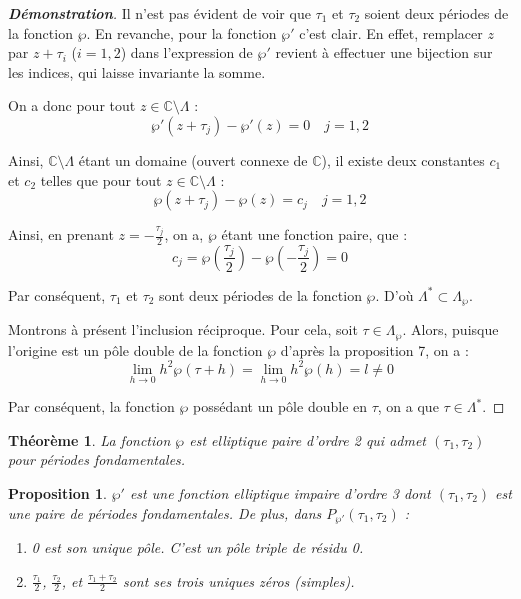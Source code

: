 \documentclass[12pt]{article}
\newtheorem{theorem}{Théorème}
\newtheorem{proposition}{Proposition}
\begin{document}
            \begin{proof}[\textbf{Démonstration}] 
            Il n'est pas évident de voir que \(\tau_1\) et \(\tau_2\) soient deux périodes de la fonction \(\wp\). En revanche, pour la fonction \(\wp'\) c'est clair. En effet, remplacer \(z\) par \(z + \tau_i\) (\(i = 1, 2\)) dans l'expression de \(\wp'\) revient à effectuer une bijection sur les indices, qui laisse invariante la somme.
            
            On a donc pour tout \(z \in \mathbb{C} \setminus \Lambda\) :
            \[
            \wp'(z + \tau_j) - \wp'(z) = 0 \quad j = 1, 2
            \]
            
            Ainsi, \(\mathbb{C} \setminus \Lambda\) étant un domaine (ouvert connexe de \(\mathbb{C}\)), il existe deux constantes \(c_1\) et \(c_2\) telles que pour tout \(z \in \mathbb{C} \setminus \Lambda\) :
            \[
            \wp(z + \tau_j) - \wp(z) = c_j \quad j = 1, 2
            \]
            
            Ainsi, en prenant \(z = -\frac{\tau_j}{2}\), on a, \(\wp\) étant une fonction paire, que :
            \[
            c_j = \wp\left(\frac{\tau_j}{2}\right) - \wp\left(-\frac{\tau_j}{2}\right) = 0
            \]
            
            Par conséquent, \(\tau_1\) et \(\tau_2\) sont deux périodes de la fonction \(\wp\). D'où \(\Lambda^* \subset \Lambda_{\wp}\).
            
            Montrons à présent l'inclusion réciproque. Pour cela, soit \(\tau \in \Lambda_{\wp}\). Alors, puisque l'origine est un pôle double de la fonction \(\wp\) d'après la proposition 7, on a :
            \[
            \lim_{h \to 0} h^2 \wp(\tau + h) = \lim_{h \to 0} h^2 \wp(h) = l \neq 0
            \]
            
            Par conséquent, la fonction \(\wp\) possédant un pôle double en \(\tau\), on a que \(\tau \in \Lambda^*\).
            \end{proof}
            
            \begin{theorem}
            La fonction \(\wp\) est elliptique paire d'ordre 2 qui admet \((\tau_1, \tau_2)\) pour périodes fondamentales.
            \end{theorem}
            
            \begin{proposition}
            \(\wp'\) est une fonction elliptique impaire d'ordre 3 dont \((\tau_1, \tau_2)\) est une paire de périodes fondamentales. De plus, dans \(P_{\wp'} (\tau_1, \tau_2)\) :
            \begin{enumerate}
                \item 0 est son unique pôle. C'est un pôle triple de résidu 0.
                \item \(\frac{\tau_1}{2}\), \(\frac{\tau_2}{2}\), et \(\frac{\tau_1 + \tau_2}{2}\) sont ses trois uniques zéros (simples).
            \end{enumerate}
            \end{proposition}
            
\end{document}

